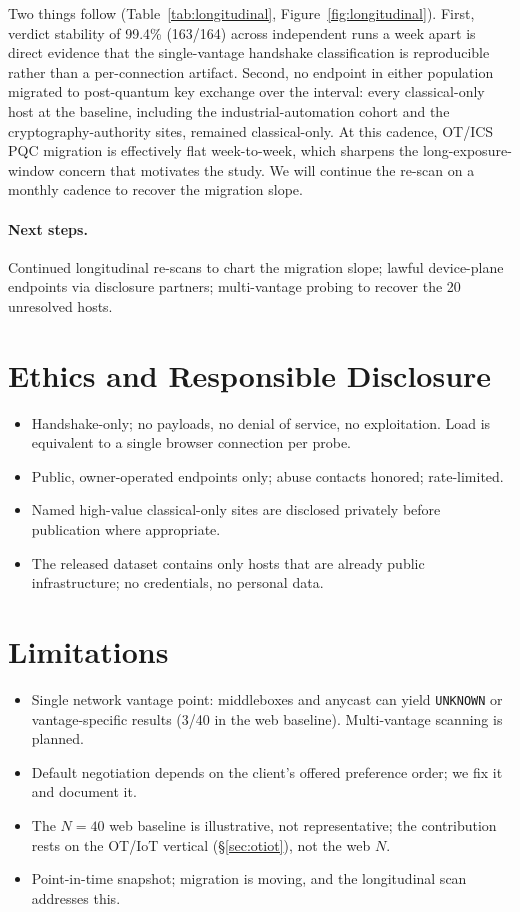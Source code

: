 \documentclass[11pt]{article}
\newcommand{\code}[1]{\texttt{#1}}
\begin{document}
Two things follow (Table~\ref{tab:longitudinal}, Figure~\ref{fig:longitudinal}).
First, verdict stability of 99.4\% (163/164) across independent runs a week
apart is direct evidence that the single-vantage handshake classification is
reproducible rather than a per-connection artifact. Second, no endpoint in
either population migrated to post-quantum key exchange over the interval:
every classical-only host at the baseline, including the industrial-automation
cohort and the cryptography-authority sites, remained classical-only. At this
cadence, OT/ICS PQC migration is effectively flat week-to-week, which sharpens
the long-exposure-window concern that motivates the study. We will continue the
re-scan on a monthly cadence to recover the migration slope.

\paragraph{Next steps.}
Continued longitudinal re-scans to chart the migration slope; lawful
device-plane endpoints via disclosure partners; multi-vantage probing to
recover the 20 unresolved hosts.

\section{Ethics and Responsible Disclosure}
\label{sec:ethics}

\begin{itemize}
  \item Handshake-only; no payloads, no denial of service, no exploitation. Load is
        equivalent to a single browser connection per probe.
  \item Public, owner-operated endpoints only; abuse contacts honored; rate-limited.
  \item Named high-value classical-only sites are disclosed privately before
        publication where appropriate.
  \item The released dataset contains only hosts that are already public
        infrastructure; no credentials, no personal data.
\end{itemize}

\section{Limitations}
\label{sec:limits}

\begin{itemize}
  \item Single network vantage point: middleboxes and anycast can yield \code{UNKNOWN}
        or vantage-specific results (3/40 in the web baseline). Multi-vantage scanning
        is planned.
  \item Default negotiation depends on the client's offered preference order; we fix it
        and document it.
  \item The $N{=}40$ web baseline is illustrative, not representative; the contribution
        rests on the OT/IoT vertical (\S\ref{sec:otiot}), not the web $N$.
  \item Point-in-time snapshot; migration is moving, and the longitudinal scan addresses
        this.
\end{itemize}
\end{document}
